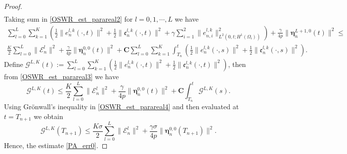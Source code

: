 \documentclass[11pt]{article}
\begin{document}
\begin{proof}
\begin{multline}
\end{multline}
Taking sum in \eqref{OSWR_est_parareal2} for $l=0, 1,\cdots, L$ we have 
\begin{multline}\label{OSWR_est_parareal3}
\sum_{l=0}^L  \sum_{k=1}^K  \left( \frac{1}{2}\parallel {e}_n^{l,k}(\cdot,t)\parallel^2 + \frac{1}{2}\parallel \mathfrak{e}_n^{l,k}(\cdot, t)\parallel^2 +\gamma\sum_{i=1}^2 \parallel {e}_{n,i}^{l,k}\parallel_{L^2(0,t;H^1(\Omega_i))}^2\right) +\frac{\gamma}{4p} \parallel\boldsymbol{\eta}_n^{L+1,0}(t)\parallel^2 \leq \\ \frac{K}{2} \sum_{l=0}^L \parallel \mathcal{E}_{n}^{l}\parallel^2  +\frac{\gamma}{4p} \parallel\boldsymbol{\eta}_n^{0,0}(t)\parallel^2 + \boldsymbol{C}\sum_{l=0}^L \sum_{k=1}^K\int_{T_{n}}^t \left( \frac{1}{2}\parallel {e}_n^{l, k}(\cdot,s)\parallel^2 + \frac{1}{2}\parallel \mathfrak{e}_n^{l,k}(\cdot, s)\parallel^2 \right).
\end{multline}
Define $\mathcal{G}^{L,K}(t):=\sum_{l=0}^L  \sum_{k=1}^K  \left( \frac{1}{2}\parallel {e}_n^{l,k}(\cdot,t)\parallel^2 + \frac{1}{2}\parallel \mathfrak{e}_n^{l,k}(\cdot, t)\parallel^2 \right)$, then from \eqref{OSWR_est_parareal3} we have 
\begin{equation}\label{OSWR_est_parareal4}
\mathcal{G}^{L,K}(t) \leq \frac{K}{2} \sum_{l=0}^L \parallel \mathcal{E}_{n}^{l}\parallel^2  +\frac{\gamma}{4p} \parallel\boldsymbol{\eta}_n^{0,0}(t)\parallel^2 + \boldsymbol{C} \int_{T_{n}}^t \mathcal{G}^{L,K}(s). 
\end{equation}
Using Gr\"{o}nwall's inequality in \eqref{OSWR_est_parareal4} and then evaluated at $t=T_{n+1}$ we obtain 
\begin{equation*}
\mathcal{G}^{L,K}(T_{n+1}) \leq  \frac{K\sigma}{2} \sum_{l=0}^L \parallel \mathcal{E}_{n}^{l}\parallel^2  +\frac{\gamma\sigma}{4p} \parallel\boldsymbol{\eta}_n^{0,0}(T_{n+1})\parallel^2.
\end{equation*}
 Hence, the estimate \eqref{PA_err0}.
\end{proof}
\end{document}
